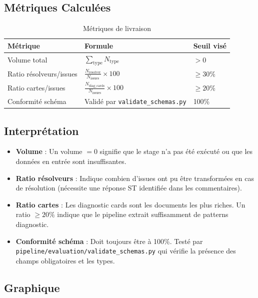 \documentclass[a4paper,12pt]{article}
\begin{document}
\subsection{Métriques Calculées}

\begin{table}[H]
\centering
\caption{Métriques de livraison}
\label{tab:delivery_metrics}
\begin{tabular}{>{\raggedright}p{5.5cm} p{5.5cm} p{3cm}}
\toprule
\textbf{Métrique} & \textbf{Formule} & \textbf{Seuil visé} \\
\midrule
Volume total & $\displaystyle \sum_{\text{type}} N_{\text{type}}$ & $> 0$ \\[8pt]
Ratio résolveurs/issues & $\displaystyle \frac{N_{\text{resolver}}}{N_{\text{issues}}} \times 100$ & $\geq 30\%$ \\[8pt]
Ratio cartes/issues & $\displaystyle \frac{N_{\text{diag\_cards}}}{N_{\text{issues}}} \times 100$ & $\geq 20\%$ \\[8pt]
Conformité schéma & Validé par \texttt{validate\_schemas.py} & 100\% \\
\bottomrule
\end{tabular}
\end{table}

\subsection{Interprétation}

\begin{itemize}[leftmargin=*]
    \item \textbf{Volume} : Un volume $=0$ signifie que le stage n'a pas été exécuté ou que les données en entrée sont insuffisantes.
    \item \textbf{Ratio résolveurs} : Indique combien d'issues ont pu être transformées en cas de résolution (nécessite une réponse ST identifiée dans les commentaires).
    \item \textbf{Ratio cartes} : Les diagnostic cards sont les documents les plus riches. Un ratio $\geq 20\%$ indique que le pipeline extrait suffisamment de patterns diagnostic.
    \item \textbf{Conformité schéma} : Doit toujours être à 100\%. Testé par \texttt{pipeline/evaluation/validate\_schemas.py} qui vérifie la présence des champs obligatoires et les types.
\end{itemize}

\subsection{Graphique}
\end{document}
